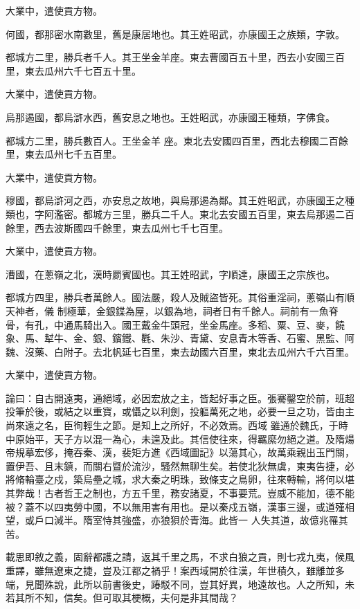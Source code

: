 \begin{pinyinscope}
 大業中，遣使貢方物。



 何國，都那密水南數里，舊是康居地也。其王姓昭武，亦康國王之族類，字敦。



 都城方二里，勝兵者千人。其王坐金羊座。東去曹國百五十里，西去小安國三百里，東去瓜州六千七百五十里。



 大業中，遣使貢方物。



 烏那遏國，都烏滸水西，舊安息之地也。王姓昭武，亦康國王種類，字佛食。



 都城方二里，勝兵數百人。王坐金羊
 座。東北去安國四百里，西北去穆國二百餘里，東去瓜州七千五百里。



 大業中，遣使貢方物。



 穆國，都烏滸河之西，亦安息之故地，與烏那遏為鄰。其王姓昭武，亦康國王之種類也，字阿濫密。都城方三里，勝兵二千人。東北去安國五百里，東去烏那遏二百餘里，西去波斯國四千餘里，東去瓜州七千七百里。



 大業中，遣使貢方物。



 漕國，在蔥嶺之北，漢時罽賓國也。其王姓昭武，字順達，康國王之宗族也。



 都城方四里，勝兵者萬餘人。國法嚴，殺人及賊盜皆死。其俗重淫祠，蔥嶺山有順天神者，儀
 制極華，金銀鍱為屋，以銀為地，祠者日有千餘人。祠前有一魚脊骨，有孔，中通馬騎出入。國王戴金牛頭冠，坐金馬座。多稻、粟、豆、麥，饒象、馬、犎牛、金、銀、鑌鐵、氍、朱沙、青黛、安息青木等香、石蜜、黑監、阿魏、沒藥、白附子。去北帆延七百里，東去劫國六百里，東北去瓜州六千六百里。



 大業中，遣使貢方物。



 論曰：自古開遠夷，通絕域，必因宏放之主，皆起好事之臣。張騫鑿空於前，班超投筆於後，或結之以重寶，或懾之以利劍，投軀萬死之地，必要一旦之功，皆由主尚來遠之名，臣徇輕生之節。是知上之所好，不必效焉。西域
 雖通於魏氏，于時中原始平，天子方以混一為心，未遑及此。其信使往來，得羈縻勿絕之道。及隋煬帝規摹宏侈，掩吞秦、漢，裴矩方進《西域圖記》以蕩其心，故萬乘親出玉門關，置伊吾、且末鎮，而關右暨於流沙，騷然無聊生矣。若使北狄無虞，東夷告捷，必將脩輪臺之戍，築烏壘之城，求大秦之明珠，致條支之鳥卵，往來轉輸，將何以堪其弊哉！古者哲王之制也，方五千里，務安諸夏，不事要荒。豈威不能加，德不能被？蓋不以四夷勞中國，不以無用害有用也。是以秦戍五嶺，漢事三邊，或道殣相望，或戶口減半。隋室恃其強盛，亦狼狽於青海。此皆一
 人失其道，故億兆罹其苦。



 載思即敘之義，固辭都護之請，返其千里之馬，不求白狼之貢，則七戎九夷，候風重譯，雖無遼東之捷，豈及江都之禍乎！案西域開於往漢，年世積久，雖離並多端，見聞殊說，此所以前書後史，踳駁不同，豈其好異，地遠故也。人之所知，未若其所不知，信矣。但可取其梗概，夫何是非其間哉？



\end{pinyinscope}
